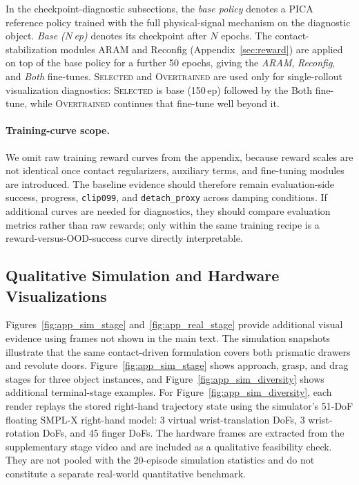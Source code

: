\documentclass{llmxive}
\begin{document}
In the checkpoint-diagnostic subsections, the \emph{base policy}
denotes a PICA reference policy trained with the full physical-signal
mechanism on the diagnostic object. \emph{Base ($N$\,ep)} denotes its
checkpoint after $N$ epochs. The contact-stabilization modules ARAM
and Reconfig (Appendix~\ref{sec:reward}) are applied on top of the
base policy for a further 50 epochs, giving the \emph{ARAM},
\emph{Reconfig}, and \emph{Both} fine-tunes. \textsc{Selected} and
\textsc{Overtrained} are used only for single-rollout visualization
diagnostics: \textsc{Selected} is base (150\,ep) followed by the Both
fine-tune, while \textsc{Overtrained} continues that fine-tune well
beyond it.

\paragraph{Training-curve scope.}
We omit raw training reward curves from the appendix, because reward
scales are not identical once contact regularizers, auxiliary terms,
and fine-tuning modules are introduced. The baseline evidence should
therefore remain evaluation-side success, progress, \texttt{clip099},
and \texttt{detach\_proxy} across damping conditions. If additional
curves are needed for diagnostics, they should compare evaluation
metrics rather than raw rewards; only within the same training recipe
is a reward-versus-OOD-success curve directly interpretable.

\subsection{Qualitative Simulation and Hardware Visualizations}
\label{sec:qual_app}

Figures~\ref{fig:app_sim_stage} and~\ref{fig:app_real_stage} provide
additional visual evidence using frames not shown in the main text.
The simulation snapshots illustrate that the same contact-driven
formulation covers both prismatic drawers and revolute doors.
Figure~\ref{fig:app_sim_stage} shows approach, grasp, and drag stages
for three object instances, and
Figure~\ref{fig:app_sim_diversity} shows additional terminal-stage
examples. For Figure~\ref{fig:app_sim_diversity}, each render replays
the stored right-hand trajectory state using the simulator's 51-DoF
floating SMPL-X right-hand model: 3 virtual wrist-translation DoFs,
3 wrist-rotation DoFs, and 45 finger DoFs. The hardware frames are extracted from the
supplementary stage video and are included as a qualitative
feasibility check. They are not pooled with the 20-episode simulation
statistics and do not constitute a separate real-world quantitative
benchmark.
\end{document}
